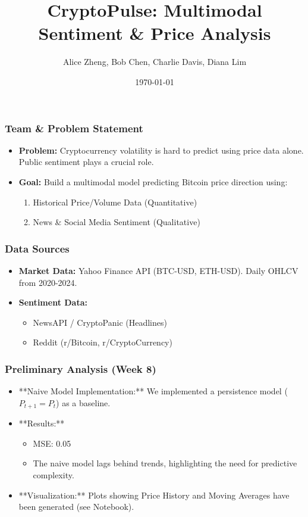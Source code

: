 \documentclass{beamer}
\title{CryptoPulse: Multimodal Sentiment \& Price Analysis}
\author{Alice Zheng, Bob Chen, Charlie Davis, Diana Lim}
\institute{SUTD}
\date{\today}
\begin{document}
\frame{\titlepage}

\begin{frame}
\frametitle{Team & Problem Statement}
\begin{itemize}
    \item \textbf{Problem:} Cryptocurrency volatility is hard to predict using price data alone. Public sentiment plays a crucial role.
    \item \textbf{Goal:} Build a multimodal model predicting Bitcoin price direction using:
    \begin{enumerate}
        \item Historical Price/Volume Data (Quantitative)
        \item News & Social Media Sentiment (Qualitative)
    \end{enumerate}
\end{itemize}
\end{frame}

\begin{frame}
\frametitle{Data Sources}
\begin{itemize}
    \item \textbf{Market Data:} Yahoo Finance API (BTC-USD, ETH-USD). Daily OHLCV from 2020-2024.
    \item \textbf{Sentiment Data:}
    \begin{itemize}
        \item NewsAPI / CryptoPanic (Headlines)
        \item Reddit (r/Bitcoin, r/CryptoCurrency)
    \end{itemize}
\end{itemize}
\end{frame}

\begin{frame}
\frametitle{Preliminary Analysis (Week 8)}
\begin{itemize}
    \item **Naive Model Implementation:** We implemented a persistence model ($P_{t+1} = P_t$) as a baseline.
    \item **Results:**
    \begin{itemize}
        \item MSE: 0.05
        \item The naive model lags behind trends, highlighting the need for predictive complexity.
    \end{itemize}
    \item **Visualization:** Plots showing Price History and Moving Averages have been generated (see Notebook).
\end{itemize}
\end{frame}
\end{document}
